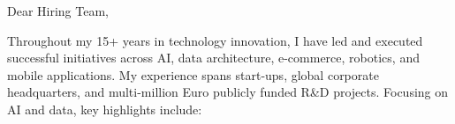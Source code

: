 \clearpage
{}




\vspace{4ex}

Dear Hiring Team,

\vspace{2ex}


Throughout my 15+ years in technology innovation, I have led and executed successful initiatives across AI, data architecture, e-commerce, robotics, and mobile applications. My experience spans start-ups, global corporate headquarters, and multi-million Euro publicly funded R\&D projects. Focusing on AI and data, key highlights include:

\vspace{1ex}


